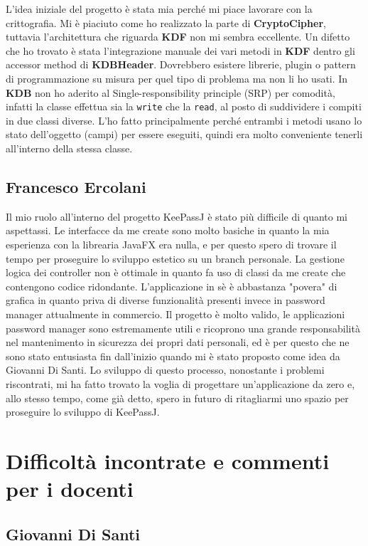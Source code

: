\documentclass[a4paper,12pt]{report}
\begin{document}
L'idea iniziale del progetto è stata mia perché mi piace lavorare con la crittografia.
Mi è piaciuto come ho realizzato la parte di \textbf{CryptoCipher}, tuttavia l'architettura
che riguarda \textbf{KDF} non mi sembra eccellente. Un difetto che ho trovato
è stata l'integrazione manuale dei vari metodi in \textbf{KDF} dentro gli accessor
method di \textbf{KDBHeader}.  Dovrebbero esistere librerie, plugin o pattern di
programmazione su misura per quel tipo di problema ma non li ho usati.
In \textbf{KDB} non ho aderito al Single-responsibility principle (SRP) per comodità,
infatti la classe effettua sia la \texttt{write} che la \texttt{read}, al posto di suddividere
i compiti in due classi diverse. L'ho fatto principalmente perché entrambi i metodi
usano lo stato dell'oggetto (campi) per essere eseguiti, quindi era molto conveniente
tenerli all'interno della stessa classe.

\subsection*{Francesco Ercolani}
Il mio ruolo all'interno del progetto KeePassJ è stato più difficile di quanto mi aspettassi. 
Le interfacce da me create sono molto basiche in quanto la mia esperienza con la librearia JavaFX era nulla, 
e per questo spero di trovare il tempo per proseguire lo sviluppo estetico su un branch personale. 
La gestione logica dei controller non è ottimale in quanto fa uso di classi da me create che contengono codice ridondante. 
L'applicazione in sè è abbastanza "povera" di grafica in quanto priva di diverse funzionalità presenti invece in password manager attualmente in commercio.
Il progetto è molto valido, le applicazioni password manager sono estremamente utili e ricoprono una grande 
responsabilità nel mantenimento in sicurezza dei propri dati personali, ed è per questo che ne sono stato entusiasta fin dall'inizio quando mi è stato proposto come idea da Giovanni Di Santi.
Lo sviluppo di questo processo, nonostante i problemi riscontrati, mi ha fatto trovato la voglia di progettare un'applicazione da zero
 e, allo stesso tempo, come già detto, spero in futuro di ritagliarmi uno spazio per proseguire lo sviluppo di KeePassJ.

\section{Difficoltà incontrate e commenti per i docenti}

\subsection*{Giovanni Di Santi}
\end{document}
